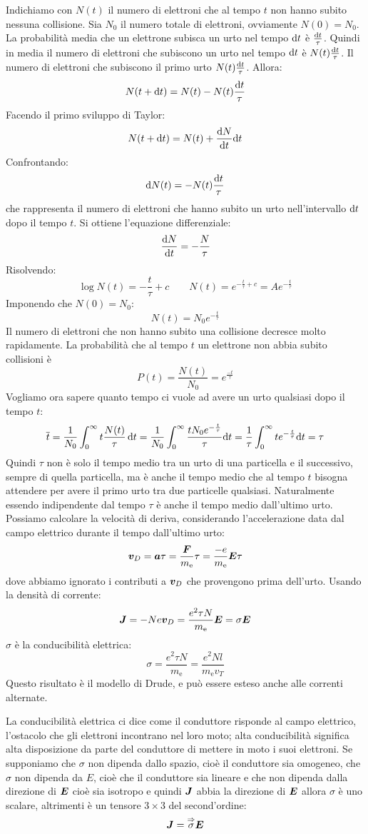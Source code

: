 Indichiamo con $N(t)$ il numero di elettroni che al tempo $t$ non hanno subito nessuna collisione. Sia $N_0$ il numero totale di elettroni, ovviamente $N(0)=N_0$. La probabilità media che un elettrone subisca un urto nel tempo $\mathrm{d} t$ è $\frac{\mathrm{d} t}{\tau}$. Quindi in media il numero di elettroni che subiscono un urto nel tempo $\mathrm{d} t$ è $N(t)\frac{\mathrm{d} t}{\tau}$. Il numero di elettroni che subiscono il primo urto $N(t)\frac{\mathrm{d} t}{\tau}$. Allora:
\[N(t+\mathrm{d} t)=N(t)-N(t)\frac{\mathrm{d} t}{\tau}\]
Facendo il primo sviluppo di Taylor:
\[N(t+\mathrm{d} t)=N(t)+\frac{\mathrm{d} N}{\mathrm{d} t}\mathrm{d} t\]
Confrontando:
\[\mathrm{d} N(t)=-N(t)\frac{\mathrm{d} t}{\tau}\]
che rappresenta il numero di elettroni che hanno subito un urto nell'intervallo $\mathrm{d} t$ dopo il tempo $t$. Si ottiene l'equazione differenziale:
\[\frac{\mathrm{d} N}{\mathrm{d} t}=-\frac{N}{\tau}\]
Risolvendo:
\[\log N(t)=-\frac{t}{\tau}+c \qquad N(t)=e^{-\frac{t}{\tau}+c}=Ae^{-\frac{t}{\tau}}\]
Imponendo che $N(0)=N_0$:
\[N(t)=N_0e^{-\frac{t}{\tau}}\]
Il numero di elettroni che non hanno subito una collisione decresce molto rapidamente. La probabilità che al tempo $t$ un elettrone non abbia subito collisioni è
\[P(t)=\frac{N(t)}{N_0}=e^{\frac{-t}{\tau}}\]
Vogliamo ora sapere quanto tempo ci vuole ad avere un urto qualsiasi dopo il tempo $t$:
\[\overline{t}=\frac{1}{N_0}\int_0^\infty t\frac{N(t)}{\tau}\,\mathrm{d} t=\frac{1}{N_0}\int_0^\infty\frac{tN_0 e^{-\frac{t}{\tau}}}{\tau}\mathrm{d} t=\frac{1}{\tau}\int_0^\infty te^{-\frac{t}{\tau}} \mathrm{d} t=\tau\]
Quindi $\tau$ non è solo il tempo medio tra un urto di una particella e il successivo, sempre di quella particella, ma è anche il tempo medio che al tempo $t$ bisogna attendere per avere il primo urto tra due particelle qualsiasi. Naturalmente essendo indipendente dal tempo $\tau$ è anche il tempo medio dall'ultimo urto. Possiamo calcolare la velocità di deriva, considerando l'accelerazione data dal campo elettrico durante il tempo dall'ultimo urto:
\[\boldsymbol{v}_D=\boldsymbol{a}\tau=\frac{\boldsymbol{F}}{m_\mathrm{e}}\tau=\frac{-e}{m_\mathrm{e}}{\boldsymbol{E}}\tau\]
dove abbiamo ignorato i contributi a $\boldsymbol{v}_D$ che provengono prima dell'urto. Usando la densità di corrente:
\[\boldsymbol{J}=-Ne\boldsymbol{v}_D=\frac{e^2\tau N}{m_\mathrm{e}}\boldsymbol{E}=\sigma\boldsymbol{E}\]
$\sigma$ è la conducibilità elettrica:
\[\sigma=\frac{e^2\tau N}{m_\mathrm{e}}=\frac{e^2Nl}{m_\mathrm{e}v_T}\]
Questo risultato è il modello di Drude, e può essere esteso anche alle correnti alternate.

La conducibilità elettrica ci dice come il conduttore risponde al campo elettrico, l'ostacolo che gli elettroni incontrano nel loro moto; alta conducibilità significa alta disposizione da parte del conduttore di mettere in moto i suoi elettroni. Se supponiamo che $\sigma$ non dipenda dallo spazio, cioè il conduttore sia omogeneo, che $\sigma$ non dipenda da $E$, cioè che il conduttore sia lineare e che non dipenda dalla direzione di $\boldsymbol{E}$ cioè sia isotropo e quindi $\boldsymbol{J}$ abbia la direzione di $\boldsymbol{E}$ allora $\sigma$ è uno scalare, altrimenti è un tensore $3\times 3$ del second'ordine:
\[\boldsymbol{J}=\overset{\Rightarrow}{\sigma}\boldsymbol{E}\]
